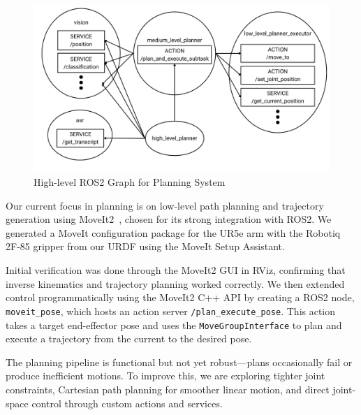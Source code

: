 \documentclass[12pt]{extarticle}
\begin{document}
\begin{figure}[h]
    \centering
    \includegraphics[width=\linewidth]{images/ros2_graph.png}
    \caption{High-level ROS2 Graph for Planning System}
    \label{fig: ros2-graph}
\end{figure}

Our current focus in planning is on low-level path planning and trajectory generation using MoveIt2~\cite{moveit2}, chosen for its strong integration with ROS2. We generated a MoveIt configuration package for the UR5e arm with the Robotiq 2F-85 gripper from our URDF using the MoveIt Setup Assistant.

Initial verification was done through the MoveIt2 GUI in RViz, confirming that inverse kinematics and trajectory planning worked correctly. We then extended control programmatically using the MoveIt2 C++ API by creating a ROS2 node, \texttt{moveit\_pose}, which hosts an action server \texttt{/plan\_execute\_pose}. This action takes a target end-effector pose and uses the \texttt{MoveGroupInterface} to plan and execute a trajectory from the current to the desired pose.

The planning pipeline is functional but not yet robust—plans occasionally fail or produce inefficient motions. To improve this, we are exploring tighter joint constraints, Cartesian path planning for smoother linear motion, and direct joint-space control through custom actions and services.
\end{document}
